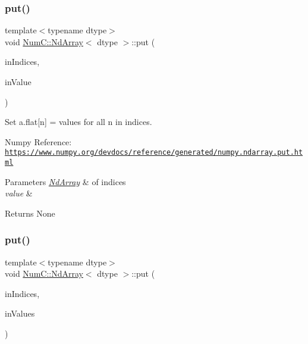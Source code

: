 \subsubsection{\texorpdfstring{put()}{put()}\hspace{0.1cm}{\footnotesize\ttfamily [3/12]}}
{\footnotesize\ttfamily template$<$typename dtype$>$ \\
void \mbox{\hyperlink{class_num_c_1_1_nd_array}{Num\+C\+::\+Nd\+Array}}$<$ dtype $>$\+::put (\begin{DoxyParamCaption}\item[{const \mbox{\hyperlink{class_num_c_1_1_nd_array}{Nd\+Array}}$<$ \mbox{\hyperlink{namespace_num_c_ae685802ca6d3035f2b400b081e3953fa}{uint32}} $>$ \&}]{in\+Indices,  }\item[{dtype}]{in\+Value }\end{DoxyParamCaption})\hspace{0.3cm}{\ttfamily [inline]}}

Set a.\+flat\mbox{[}n\mbox{]} = values for all n in indices.

Numpy Reference\+: \href{https://www.numpy.org/devdocs/reference/generated/numpy.ndarray.put.html}{\tt https\+://www.\+numpy.\+org/devdocs/reference/generated/numpy.\+ndarray.\+put.\+html}


\begin{DoxyParams}{Parameters}
{\em \mbox{\hyperlink{class_num_c_1_1_nd_array}{Nd\+Array}}} & of indices \\
\hline
{\em value} & \\
\hline
\end{DoxyParams}
\begin{DoxyReturn}{Returns}
None 
\end{DoxyReturn}
\mbox{\label{class_num_c_1_1_nd_array_a5bd27656a5a052f4f1757881bb8c5117}} 
\subsubsection{\texorpdfstring{put()}{put()}\hspace{0.1cm}{\footnotesize\ttfamily [4/12]}}
{\footnotesize\ttfamily template$<$typename dtype$>$ \\
void \mbox{\hyperlink{class_num_c_1_1_nd_array}{Num\+C\+::\+Nd\+Array}}$<$ dtype $>$\+::put (\begin{DoxyParamCaption}\item[{const \mbox{\hyperlink{class_num_c_1_1_nd_array}{Nd\+Array}}$<$ \mbox{\hyperlink{namespace_num_c_ae685802ca6d3035f2b400b081e3953fa}{uint32}} $>$ \&}]{in\+Indices,  }\item[{const \mbox{\hyperlink{class_num_c_1_1_nd_array}{Nd\+Array}}$<$ dtype $>$ \&}]{in\+Values }\end{DoxyParamCaption})\hspace{0.3cm}{\ttfamily [inline]}}

